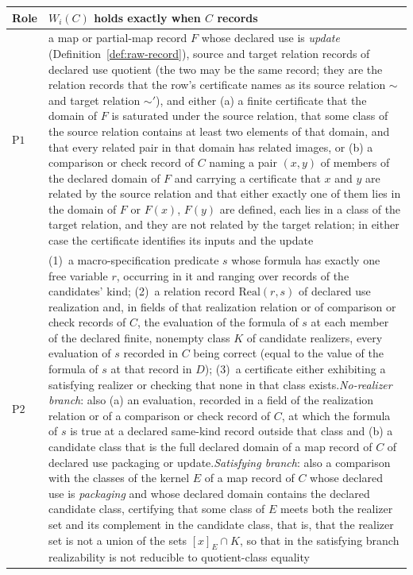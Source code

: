 \documentclass[11pt]{article}
\theoremstyle{definition}
\newcommand{\Pone}{\ensuremath{\mathrm{P1}}}
\newcommand{\Ptwo}{\ensuremath{\mathrm{P2}}}
\begin{document}
\begin{center}
\small
\begin{tabularx}{\linewidth}{@{}l>{\raggedright\arraybackslash}X@{}}
\toprule
Role & \(W_i(C)\) holds exactly when \(C\) records \\
\midrule
\Pone{} & a map or partial-map record \(F\) whose declared use is \emph{update} (Definition~\ref{def:raw-record}), source and target relation records of declared use quotient (the two may be the same record; they are the relation records that the row's certificate names as its source relation \(\sim\) and target relation \(\sim'\)), and either (a) a finite certificate that the domain of \(F\) is saturated under the source relation, that some class of the source relation contains at least two elements of that domain, and that every related pair in that domain has related images, or (b) a comparison or check record of \(C\) naming a pair \((x,y)\) of members of the declared domain of \(F\) and carrying a certificate that \(x\) and \(y\) are related by the source relation and that either exactly one of them lies in the domain of \(F\) or \(F(x)\), \(F(y)\) are defined, each lies in a class of the target relation, and they are not related by the target relation; in either case the certificate identifies its inputs and the update \\
\Ptwo{} & (1)~a macro-specification predicate \(s\) whose formula has exactly one free variable \(r\), occurring in it and ranging over records of the candidates' kind; (2)~a relation record \(\mathrm{Real}(r,s)\) of declared use realization and, in fields of that realization relation or of comparison or check records of \(C\), the evaluation of the formula of \(s\) at each member of the declared finite, nonempty class \(K\) of candidate realizers, every evaluation of \(s\) recorded in \(C\) being correct (equal to the value of the formula of \(s\) at that record in \(D\)); (3)~a certificate either exhibiting a satisfying realizer or checking that none in that class exists.\newline \emph{No-realizer branch}: also (a) an evaluation, recorded in a field of the realization relation or of a comparison or check record of \(C\), at which the formula of \(s\) is true at a declared same-kind record outside that class and (b) a candidate class that is the full declared domain of a map record of \(C\) of declared use packaging or update.\newline \emph{Satisfying branch}: also a comparison with the classes of the kernel \(E\) of a map record of \(C\) whose declared use is \emph{packaging} and whose declared domain contains the declared candidate class, certifying that some class of \(E\) meets both the realizer set and its complement in the candidate class, that is, that the realizer set is not a union of the sets \([x]_E\cap K\), so that in the satisfying branch realizability is not reducible to quotient-class equality \\

\end{tabularx}
\end{center}
\end{document}
